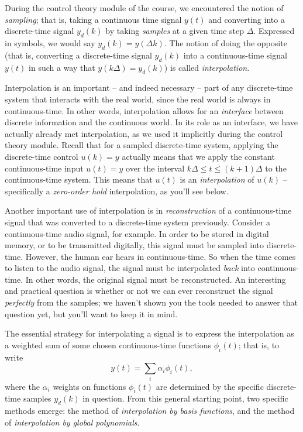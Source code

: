 

During the control theory module of the course, we encountered the notion of \emph{sampling}; that is, taking a continuous time signal $y(t)$ and converting into a discrete-time signal $y_d(k)$ by taking \emph{samples} at a given time step $\Delta$. Expressed in symbols, we would say $y_d(k)=y(\Delta k)$.
The notion of doing the opposite (that is, converting a discrete-time signal $y_d(k)$ into a continuous-time signal $y(t)$ in such a way that $y(k\Delta)=y_d(k)$) is called \emph{interpolation}.

Interpolation is an important -- and indeed necessary -- part of any discrete-time system that interacts with the real world, since the real world is always in continuous-time.
In other words, interpolation allows for an \emph{interface} between discrete information and the continuous world.
In its role as an interface, we have actually already met interpolation, as we used it implicitly during the control theory module.
Recall that for a sampled discrete-time system, applying the discrete-time control $u(k)=y$ actually means that we apply the constant continuous-time input $u(t)=y$ over the interval $k\Delta\le t \le (k+1)\Delta$ to the continuous-time system.
This means that $u(t)$ is an \emph{interpolation} of $u(k)$ -- specifically a \emph{zero-order hold} interpolation, as you'll see below.

Another important use of interpolation is in \emph{reconstruction} of a continuous-time signal that was converted to a discrete-time system previously.
Consider a continuous-time audio signal, for example.
In order to be stored in digital memory, or to be transmitted digitally, this signal must be sampled into discrete-time.
However, the human ear hears in continuous-time.
So when the time comes to listen to the audio signal, the signal must be interpolated \emph{back} into continuous-time.
In other words, the original signal must be reconstructed.
An interesting and practical question is whether or not we can ever reconstruct the signal \emph{perfectly} from the samples; we haven't shown you the tools needed to answer that question yet, but you'll want to keep it in mind.

The essential strategy for interpolating a signal is to express the interpolation as a weighted sum of some chosen continuous-time functions $\phi_i(t)$; that is, to write
\begin{equation*}
 y(t) = \sum_i \alpha_i \phi_i(t),
\end{equation*}
where the $\alpha_i$ weights on functions $\phi_i(t)$ are determined by the specific discrete-time samples $y_d(k)$ in question.
From this general starting point, two specific methods emerge: the method of \emph{interpolation by basis functions}, and the method of \emph{interpolation by global polynomials}.

